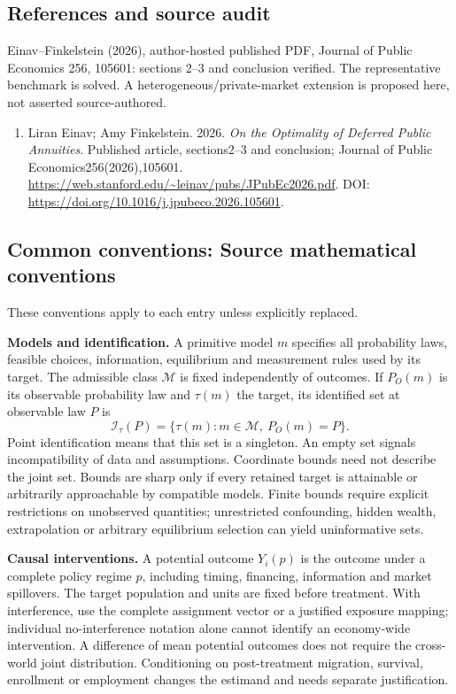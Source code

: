 \documentclass[11pt,a4paper]{article}
\begin{document}
\subsection*{References and source audit}
Einav--Finkelstein (2026), author-hosted published PDF, Journal of Public Economics 256, 105601: sections 2--3 and conclusion verified. The representative benchmark is solved. A heterogeneous/private-market extension is proposed here, not asserted source-authored.
\begin{enumerate}\raggedright
\item\hypertarget{definitions:source:30007761:1}{} Liran Einav; Amy Finkelstein. 2026. \emph{On the Optimality of Deferred Public Annuities}. Published article, sections2–3 and conclusion; Journal of Public Economics256(2026),105601.
\url{https://web.stanford.edu/~leinav/pubs/JPubEc2026.pdf}.
DOI: \url{https://doi.org/10.1016/j.jpubeco.2026.105601}.
\end{enumerate}

\subsection*{Common conventions: Source mathematical conventions}

These conventions apply to each entry unless explicitly replaced.

\textbf{Models and identification.} A primitive model \(m\) specifies all probability laws, feasible choices, information, equilibrium and measurement rules used by its target. The admissible class \(\mathcal M\) is fixed independently of outcomes. If \(P_O(m)\) is its observable probability law and \(\tau(m)\) the target, its identified set at observable law \(P\) is
\[
 \mathcal I_\tau(P)=\{\tau(m):m\in\mathcal M,\ P_O(m)=P\}.
\]
Point identification means that this set is a singleton. An empty set signals incompatibility of data and assumptions. Coordinate bounds need not describe the joint set. Bounds are sharp only if every retained target is attainable or arbitrarily approachable by compatible models. Finite bounds require explicit restrictions on unobserved quantities; unrestricted confounding, hidden wealth, extrapolation or arbitrary equilibrium selection can yield uninformative sets.

\textbf{Causal interventions.} A potential outcome \(Y_i(p)\) is the outcome under a complete policy regime \(p\), including timing, financing, information and market spillovers. The target population and units are fixed before treatment. With interference, use the complete assignment vector or a justified exposure mapping; individual no-interference notation alone cannot identify an economy-wide intervention. A difference of mean potential outcomes does not require the cross-world joint distribution. Conditioning on post-treatment migration, survival, enrollment or employment changes the estimand and needs separate justification.
\end{document}

